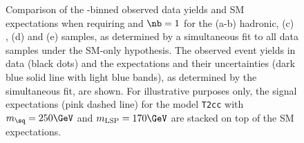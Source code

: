 \begin{figure}[t!]
\begin{center}
{    } 
    \caption{\label{fig:best-fit-le3j1b} Comparison of the
      \scalht-binned observed data yields and SM expectations when
      requiring \njetlow and $\nb = 1$ for the (a-b) hadronic, (c)
      \mj, (d) \mmj and (e) \gj samples, as determined by a
      simultaneous fit to all data samples under the SM-only
      hypothesis. The observed event yields in data (black dots) and
      the expectations and their uncertainties (dark blue solid line
      with light blue bands), as determined by the simultaneous fit,
      are shown. For illustrative purposes only, the signal
      expectations (pink dashed line) for the model \texttt{T2cc} with
      $m_{\sq} = 250\GeV$ and $m_{\text{LSP}} = 170\GeV$ are stacked
      on top of the SM expectations.}
  \end{center}
\end{figure}

